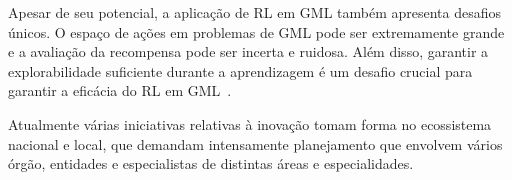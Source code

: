 Apesar de seu potencial, a aplicação de RL em GML também apresenta desafios únicos. O espaço de ações em problemas de GML pode ser extremamente grande e a avaliação da recompensa pode ser incerta e ruidosa. Além disso, garantir a explorabilidade suficiente durante a aprendizagem é um desafio crucial para garantir a eficácia do RL em GML~\cite{Zhang2020}.

Atualmente várias iniciativas relativas à inovação tomam forma no ecossistema nacional e local, que demandam intensamente planejamento que envolvem vários órgão, entidades e especialistas de distintas áreas e especialidades.